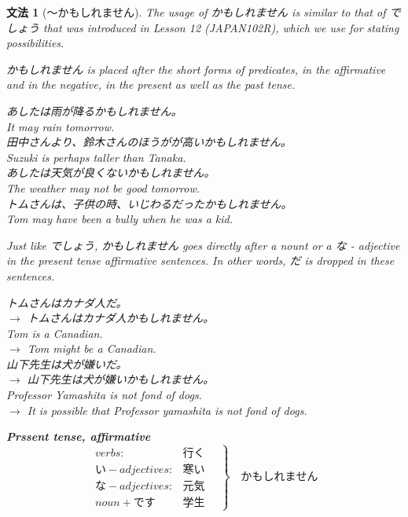\documentclass[notoc,notitlepage]{tufte-book}
\newtheorem{grammar}{\faBook \enspace 文法}[section]
\begin{document}
\begin{grammar}[〜かもしれません]
\label{grammar:_kamoshiremasen}
  The usage of かもしれません is similar to that of でしょう that was introduced in Lesson 12 (JAPAN102R), which we use for stating possibilities.

  \noindent かもしれません is placed after the short forms of predicates, in the affirmative and in the negative, in the present as well as the past tense.

  あしたは雨が降るかもしれません。\\
  It may rain tomorrow. \\
  田中さんより、鈴木さんのほうがが高いかもしれません。\\
  Suzuki is perhaps taller than Tanaka. \\
  あしたは天気が良くないかもしれません。\\
  The weather may not be good tomorrow. \\
  トムさんは、子供の時、いじわるだったかもしれません。\\
  Tom may have been a bully when he was a kid.

  \noindent Just like でしょう, かもしれません goes directly after a nount or a な - adjective in the present tense affirmative sentences. In other words, だ is dropped in these sentences.

  トムさんはカナダ人だ。\\
  $\to$ トムさんはカナダ人かもしれません。 \\
  Tom is a Canadian. \\
  $\to$ Tom might be a Canadian. \\
  山下先生は犬が嫌いだ。 \\
  $\to$ 山下先生は犬が嫌いかもしれません。\\
  Professor Yamashita is not fond of dogs. \\
  $\to$ It is possible that Professor yamashita is not fond of dogs.

  \textbf{Prssent tense, affirmative} \\
  \begin{equation*}
    \left.\begin{aligned}
      verbs: & 行く \\
      い - adjectives: & 寒い \\
      な - adjectives: & 元気 \\
      noun + です & 学生
    \end{aligned} \quad \right\} \quad かもしれません
  \end{equation*}
\end{grammar}
\end{document}
